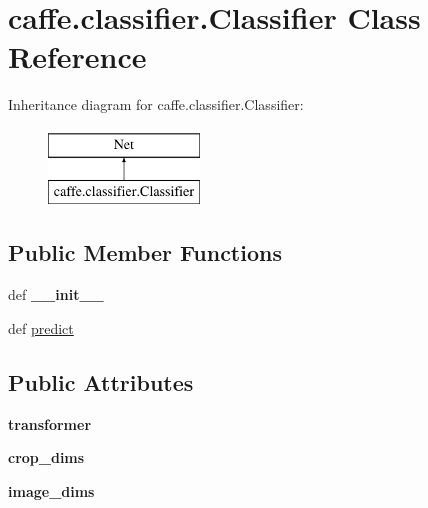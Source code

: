 \hypertarget{classcaffe_1_1classifier_1_1_classifier}{}\section{caffe.\+classifier.\+Classifier Class Reference}
\label{classcaffe_1_1classifier_1_1_classifier}
Inheritance diagram for caffe.\+classifier.\+Classifier\+:\begin{figure}[H]
\begin{center}
\leavevmode
\includegraphics[height=2.000000cm]{classcaffe_1_1classifier_1_1_classifier}
\end{center}
\end{figure}
\subsection*{Public Member Functions}
\begin{DoxyCompactItemize}
\item 
\hypertarget{classcaffe_1_1classifier_1_1_classifier_a2eb5b645a1badd2395b332603d6feb33}{}def {\bfseries \+\_\+\+\_\+init\+\_\+\+\_\+}\label{classcaffe_1_1classifier_1_1_classifier_a2eb5b645a1badd2395b332603d6feb33}

\item 
def \hyperlink{classcaffe_1_1classifier_1_1_classifier_ad888ddf4fb41062925d9e9b919812ce5}{predict}
\end{DoxyCompactItemize}
\subsection*{Public Attributes}
\begin{DoxyCompactItemize}
\item 
\hypertarget{classcaffe_1_1classifier_1_1_classifier_a44a169043638bbf48513fd17dce4f4b6}{}{\bfseries transformer}\label{classcaffe_1_1classifier_1_1_classifier_a44a169043638bbf48513fd17dce4f4b6}

\item 
\hypertarget{classcaffe_1_1classifier_1_1_classifier_a298c47f5b8863db1b3fc06ee3ed0b7ac}{}{\bfseries crop\+\_\+dims}\label{classcaffe_1_1classifier_1_1_classifier_a298c47f5b8863db1b3fc06ee3ed0b7ac}

\item 
\hypertarget{classcaffe_1_1classifier_1_1_classifier_a5e4d8e8e29e3ad083875dfca03c48ba7}{}{\bfseries image\+\_\+dims}\label{classcaffe_1_1classifier_1_1_classifier_a5e4d8e8e29e3ad083875dfca03c48ba7}

\end{DoxyCompactItemize}


